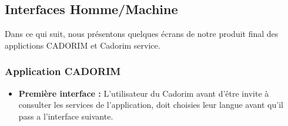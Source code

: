 \subsection{Interfaces Homme/Machine}
Dans ce qui suit, nous présentons quelques écrans de notre produit final des applictions CADORIM et Cadorim service.
\subsubsection{Application CADORIM}
\begin{itemize}[label=$\ast$]
		\item \textbf{Première interface :} L'utilisateur du Cadorim avant d'être invite à consulter les services de l'application, doit 
			choisies leur langue avant qu'il pass a l'interface suivante.
			
			\begin{figure}[!ht]
				\centering
				\begin{subfigure}{0.3\textwidth}

\end{subfigure}
\end{figure}
\end{itemize}
